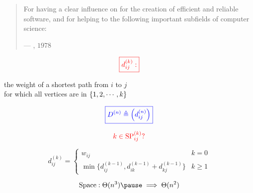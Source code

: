 
\begin{frame}{}
  {\centerline{}}

  \begin{quote}
    {\small
      For having a clear influence on  for the creation of efficient and reliable software,
      and for helping to  the following important subfields of computer science: \\[3pt]
    }

    \hfill --- , $1978$
  \end{quote}
\end{frame}

\begin{frame}{}
  \[
    \textcolor{red}{\boxed{d_{ij}^{(k)}:}}
  \]
  \begin{center}
    the weight of a shortest path from $i$ to $j$ \\[3pt]
    for which all  vertices are in $\left\{1, 2, \cdots, k\right\}$
  \end{center}

  \pause
  \[
    \textcolor{blue}{\boxed{D^{(n)} \triangleq \Big(d_{ij}^{(n)}\Big)}}
  \]
\end{frame}

\begin{frame}{}
  \[
    \textcolor{red}{k \in \text{SP}_{ij}^{(k)}?}
  \]


  \[
    d_{ij}^{(k)} = \begin{cases}
      w_{ij}	& k = 0 \\
      \min\Big\{ d_{ij}^{(k-1)}, d_{ik}^{(k-1)} + d_{kj}^{(k-1)} \Big\} & k \ge 1
    \end{cases}
  \]
\end{frame}

\begin{frame}{}
  

  \pause
  \[
    \text{Space}: \Theta(n^3) \pause \implies \Theta(n^2)
  \]
\end{frame}

